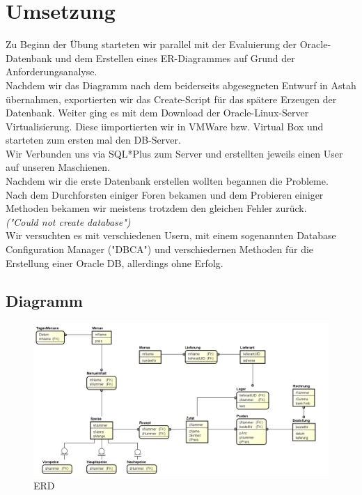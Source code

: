 \documentclass[12pt,a4paper]{article}
\begin{document}
	\section{Umsetzung}
		Zu Beginn der Übung starteten wir parallel mit der Evaluierung der Oracle-Datenbank und dem Erstellen eines ER-Diagrammes auf Grund der Anforderungsanalyse.\\
		Nachdem wir das Diagramm nach dem beiderseits abgesegneten Entwurf in Astah übernahmen, exportierten wir das Create-Script für das spätere Erzeugen der Datenbank.
		Weiter ging es mit dem Download der Oracle-Linux-Server Virtualisierung. Diese iimportierten wir in VMWare bzw. Virtual Box und starteten zum ersten mal den DB-Server.\\
		Wir Verbunden uns via SQL*Plus zum Server und erstellten jeweils einen User auf unseren Maschienen.\\
		Nachdem wir die erste Datenbank erstellen wollten begannen die Probleme.\\
		Nach dem Durchforsten einiger Foren bekamen und dem Probieren einiger Methoden bekamen wir meistens trotzdem den gleichen Fehler zurück.\\
		\textit{("Could not create database")}\\
		Wir versuchten es mit verschiedenen Usern, mit einem sogenannten Database Configuration Manager ("DBCA") und verschiedernen Methoden für die Erstellung einer Oracle DB, allerdings ohne Erfolg.\newpage
		
		\subsection{Diagramm}
			\begin{figure}[h!]
				\centering
				\includegraphics[width=1\linewidth]{ERD/MensaEr.png}
				\caption{ERD}
				\label{fig:MensaEr.png}
			\end{figure}
\end{document}
